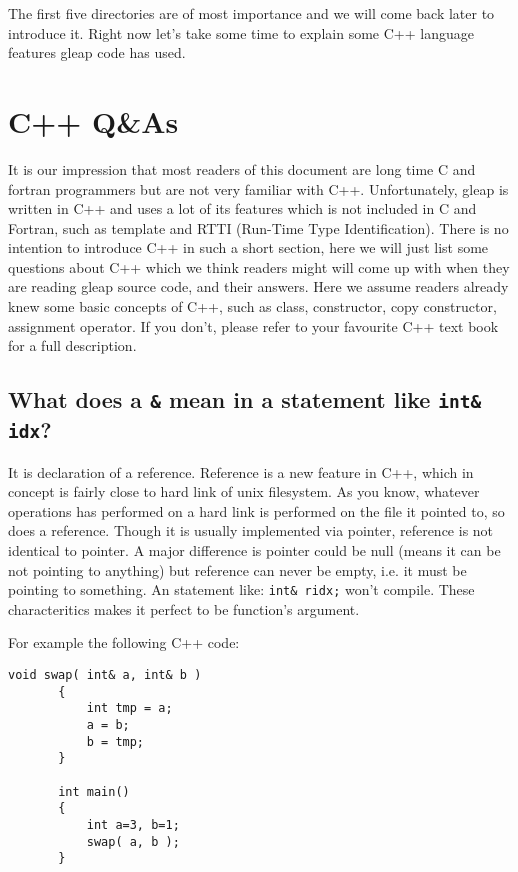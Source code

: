 \documentclass[letterpaper]{book}
\begin{document}
  The first five directories are of most importance and we will come back later
to introduce it. Right now let's take some time to explain some C++ language 
features gleap code has used.
  
\section{C++ Q\&As}
  It is our impression that most readers of this document are long time C and 
fortran programmers but are not very familiar with C++. Unfortunately, gleap is 
written in C++ and uses a lot of its features which is not included in C 
and Fortran, such as template and RTTI (Run-Time Type Identification). 
There is no intention to introduce C++ in such a short section, here we will 
just list some questions about C++ which we think readers might will come up 
with when they are reading gleap source code, and their answers. Here we assume 
readers already knew some basic concepts of C++, such as class, constructor, copy 
constructor, assignment operator. If you don't, please refer to your favourite C++ 
text book for a full description.



\subsection*{What does a \lstinline$&$ mean in a statement like \lstinline$int& idx$?}
  It is declaration of a reference. Reference is a new feature in C++, which
in concept is fairly close to hard link of unix filesystem. As you know, 
whatever operations has performed on a hard link is performed on the file 
it pointed to, so does a reference. Though it is usually implemented via 
pointer, reference is not identical to pointer. A major difference is pointer 
could be null (means it can be not pointing to anything) but reference can 
never be empty, i.e. it must be pointing to something. An statement like: 
\lstinline$int& ridx;$ won't compile. These characteritics makes it perfect 
to be function's argument. 

For example the following C++ code:

\begin{lstlisting}[frame=single]
       void swap( int& a, int& b )
       {
           int tmp = a;
           a = b;
           b = tmp;
       }

       int main()
       {
           int a=3, b=1;
           swap( a, b );
       }

\end{lstlisting}
\end{document}
